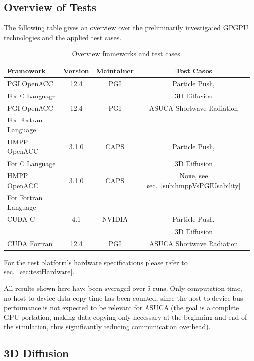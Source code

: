 \subsection{Overview of Tests}

The following table gives an overview over the preliminarily investigated GPGPU technologies and the applied test cases.

\begin{table}[htpb]
	\centering
	\footnotesize
	\begin{tabular}{l|c|c|c}
		Framework & Version & Maintainer & Test Cases \\ 
		\hline \hline
		PGI OpenACC & 12.4 & PGI & Particle Push,\\ 
		For C Language & & & 3D Diffusion \\
		\hline
		PGI OpenACC & 12.4 & PGI & ASUCA Shortwave Radiation \\ 
		For Fortran Language & & & \\
		\hline
		HMPP OpenACC & 3.1.0 & CAPS & Particle Push,\\
		For C Language & & & 3D Diffusion \\
		\hline
		HMPP OpenACC & 3.1.0 & CAPS & None, see sec.~\ref{sub:hmppVsPGIUsability}\\
		For Fortran Language & & & \\
		\hline
		CUDA C & 4.1 & NVIDIA & Particle Push,\\
		& & & 3D Diffusion \\
		\hline
		CUDA Fortran & 12.4 & PGI & ASUCA Shortwave Radiation \\ 
		\hline
	\end{tabular}
	\caption[Overview Framework Tests]{Overview frameworks and test cases.}
	\label{table:testsByFrameworksOverview}
\end{table}

For the test platform's hardware specifications please refer to sec.~\ref{sec:testHardware}. 

All results shown here have been averaged over 5 runs. Only computation time, no host-to-device data copy time has been counted, since the host-to-device bus performance is not expected to be relevant for ASUCA (the goal is a complete GPU portation, making data copying only necessary at the beginning and end of the simulation, thus significantly reducing communication overhead). 

\subsection{3D Diffusion} \label{sec:perfEvalDiffusion}

